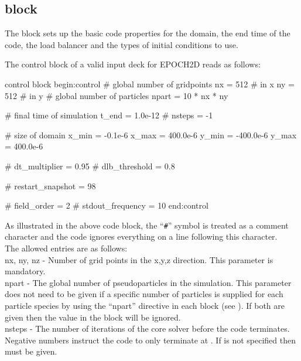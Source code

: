 \subsection{ block}
\label{sec:control_block}
The  block sets up the basic code properties for the
domain, the end time of the code, the load balancer and the types of initial
conditions to use.

The control block of a valid input deck for EPOCH2D reads as follows:
\begin{lboxverbatim}{control block}
begin:control
   # global number of gridpoints
   nx = 512 # in x
   ny = 512 # in y
   # global number of particles
   npart = 10 * nx * ny

   # final time of simulation
   t_end = 1.0e-12
   # nsteps = -1

   # size of domain
   x_min = -0.1e-6
   x_max = 400.0e-6
   y_min = -400.0e-6
   y_max = 400.0e-6

   # dt_multiplier = 0.95
   # dlb_threshold = 0.8

   # restart_snapshot = 98

   # field_order = 2
   # stdout_frequency = 10
end:control
\end{lboxverbatim}

As illustrated in the above code block, the ``{\texttt{\#}}'' symbol is treated
as a comment character and the code ignores everything on a line following this
character.\\

The allowed entries are as follows:\\

{\emphtext nx, ny, nz} - Number of grid points in the x,y,z direction. This
parameter is mandatory.\\

{\emphtext npart} - The global number of pseudoparticles in the
simulation. This parameter does not need to be given if a specific number
of particles is supplied for each particle species by using the ``npart''
directive in each  block (see ). If both are
given then the value in the  block will be ignored.\\

{\emphtext nsteps} - The number of iterations of the core solver before the
code terminates. Negative numbers instruct the code to only terminate at
. If  is not specified then
 must be given.\\

